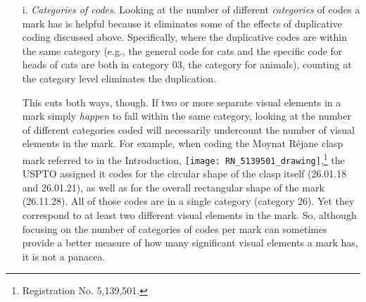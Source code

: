 \documentclass[letterpaper, 11pt, oneside]{article}
\begin{document}
\begin{enumerate}

\item[i.] \textit{Categories of codes}. Looking at the number of different \emph{categories} of codes a mark has is helpful because it eliminates some of the effects of duplicative coding discussed above. Specifically, where the duplicative codes are within the same category (e.g., the general code for cats and the specific code for heads of cats are both in category 03, the category for animals), counting at the category level eliminates the duplication.

This cuts both ways, though. If two or more separate visual elements in a mark simply \emph{happen} to fall within the same category, looking at the number of different categories coded will necessarily undercount the number of visual elements in the mark. For example, when coding the Moynat Réjane clasp mark referred to in the Introduction, \texttt{[image: RN\_5139501\_drawing]},\footnote{Registration No. 5,139,501.} the USPTO assigned it codes for the circular shape of the clasp itself (26.01.18 and 26.01.21), as well as for the overall rectangular shape of the mark (26.11.28). All of those codes are in a single category (category 26). Yet they correspond to at least two different visual elements in the mark. So, although focusing on the number of categories of codes per mark can sometimes provide a better measure of how many significant visual elements a mark has, it is not a panacea.


\end{enumerate}
\end{document}
